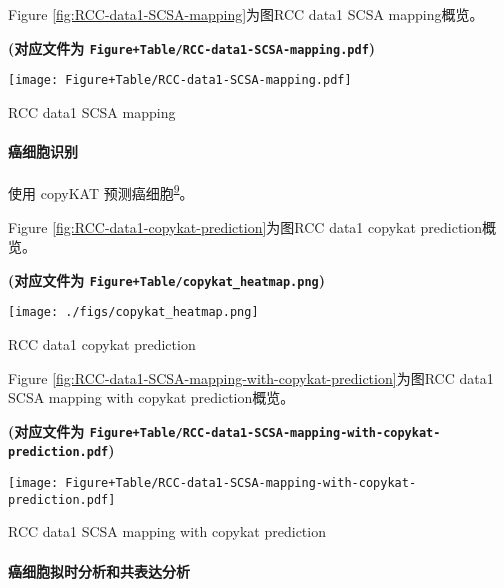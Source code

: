 \documentclass[
]{article}
\begin{document}
Figure \ref{fig:RCC-data1-SCSA-mapping}为图RCC data1 SCSA mapping概览。

\textbf{(对应文件为 \texttt{Figure+Table/RCC-data1-SCSA-mapping.pdf})}

\def\@captype{figure}
\begin{center}
\texttt{[image: Figure+Table/RCC-data1-SCSA-mapping.pdf]}
\caption{RCC data1 SCSA mapping}\label{fig:RCC-data1-SCSA-mapping}
\end{center}

\hypertarget{ux764cux7ec6ux80deux8bc6ux522b}{%
\paragraph{癌细胞识别}\label{ux764cux7ec6ux80deux8bc6ux522b}}

使用 copyKAT 预测癌细胞\textsuperscript{\protect\hyperlink{ref-DelineatingCopGaoR2021}{9}}。

Figure \ref{fig:RCC-data1-copykat-prediction}为图RCC data1 copykat prediction概览。

\textbf{(对应文件为 \texttt{Figure+Table/copykat\_heatmap.png})}

\def\@captype{figure}
\begin{center}
\texttt{[image: ./figs/copykat\_heatmap.png]}
\caption{RCC data1 copykat prediction}\label{fig:RCC-data1-copykat-prediction}
\end{center}

Figure \ref{fig:RCC-data1-SCSA-mapping-with-copykat-prediction}为图RCC data1 SCSA mapping with copykat prediction概览。

\textbf{(对应文件为 \texttt{Figure+Table/RCC-data1-SCSA-mapping-with-copykat-prediction.pdf})}

\def\@captype{figure}
\begin{center}
\texttt{[image: Figure+Table/RCC-data1-SCSA-mapping-with-copykat-prediction.pdf]}
\caption{RCC data1 SCSA mapping with copykat prediction}\label{fig:RCC-data1-SCSA-mapping-with-copykat-prediction}
\end{center}

\hypertarget{ux764cux7ec6ux80deux62dfux65f6ux5206ux6790ux548cux5171ux8868ux8fbeux5206ux6790}{%
\paragraph{癌细胞拟时分析和共表达分析}\label{ux764cux7ec6ux80deux62dfux65f6ux5206ux6790ux548cux5171ux8868ux8fbeux5206ux6790}}
\end{document}

